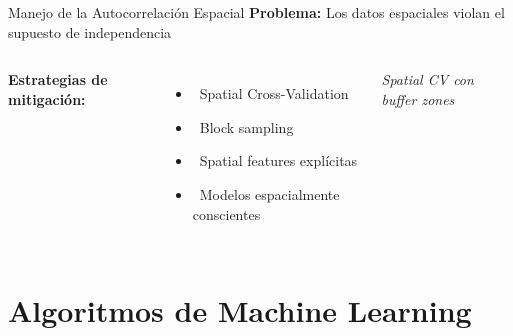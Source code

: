 \documentclass[10pt,aspectratio=169]{beamer}
\begin{document}
\begin{frame}{Manejo de la Autocorrelación Espacial}
    \textbf{Problema:} Los datos espaciales violan el supuesto de independencia

    \vspace{3mm}
    \begin{columns}
        \textbf{Estrategias de mitigación:}
        \begin{itemize}
            \item \faCheckCircle\ Spatial Cross-Validation
            \item \faCheckCircle\ Block sampling
            \item \faCheckCircle\ Spatial features explícitas
            \item \faCheckCircle\ Modelos espacialmente conscientes
        \end{itemize}


        \centering
        \small\textit{Spatial CV con buffer zones}
    \end{columns}
\end{frame}

\section{Algoritmos de Machine Learning}
\end{document}
